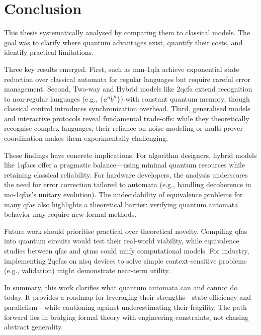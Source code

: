 \chapter{Conclusion}
\label{chap:conclusion}

This thesis systematically analysed  by comparing them to classical models. The goal was to clarify where quantum advantages exist, quantify their costs, and identify practical limitations.

Three key results emerged. First,  such as \gls{mm-1qfa} achieve exponential state reduction over classical automata for regular languages but require careful error management. Second, Two-way and Hybrid models like \gls{2qcfa} extend recognition to non-regular languages (e.g., $\{a^n b^n\}$) with constant quantum memory, though classical control introduces synchronization overhead. Third, generalised models and interactive protocols reveal fundamental trade-offs: while they theoretically recognise complex languages, their reliance on noise modeling or multi-prover coordination makes them experimentally challenging.

These findings have concrete implications. For algorithm designers, hybrid models like \glspl{1qfac} offer a pragmatic balance—using minimal quantum resources while retaining classical reliability. For hardware developers, the analysis underscores the need for error correction tailored to automata (e.g., handling decoherence in \glspl{mo-1qfa}'s unitary evolution). The undecidability of equivalence problems for many \glspl{qfa} also highlights a theoretical barrier: verifying quantum automata behavior may require new formal methods.

Future work should prioritise practical over theoretical novelty. Compiling \glspl{qfa} into quantum circuits would test their real-world viability, while equivalence studies between \glspl{qfa} and \glspl{qtm} could unify computational models. For industry, implementing \glspl{2qcfa} on \gls{nisq} devices to solve simple context-sensitive problems (e.g.,  validation) might demonstrate near-term utility.

In summary, this work clarifies what quantum automata can and cannot do today. It provides a roadmap for leveraging their strengths—state efficiency and parallelism—while cautioning against underestimating their fragility. The path forward lies in bridging formal theory with engineering constraints, not chasing abstract generality.
